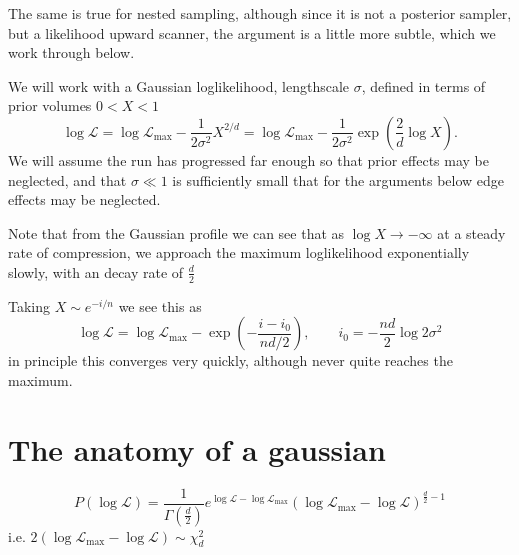\documentclass[usenatbib]{mnras}
\begin{document}
The same is true for nested sampling, although since it is not a posterior sampler, but a likelihood upward scanner, the argument is a little more subtle, which we work through below.



We will work with a Gaussian loglikelihood, lengthscale $\sigma$, defined in terms of prior volumes $0<X<1$
\begin{equation}
    \log\mathcal{L}
    =\log\mathcal{L}_\mathrm{max} - \frac{1}{2\sigma^2}X^{2/d}
    =\log\mathcal{L}_\mathrm{max} - \frac{1}{2\sigma^2}\exp\left(\frac{2}{d}\log X\right).
    \label{eq:LX}
\end{equation}
We will assume the run has progressed far enough so that prior effects may be neglected, and that $\sigma\ll 1$ is sufficiently small that for the arguments below edge effects may be neglected.

Note that from the Gaussian profile we can see that as $\log X\to-\infty$ at a steady rate of compression, we approach the maximum loglikelihood exponentially slowly, with an decay rate of $\frac{d}{2}$

Taking $X \sim e^{-i/n}$ we see this as
\begin{equation}
    \log\mathcal{L} = \log\mathcal{L}_\mathrm{max} - \exp\left(-\frac{i-i_0}{nd/2}\right), \qquad i_0 = -\frac{nd}{2}\log 2\sigma^2
\end{equation}
in principle this converges very quickly, although never quite reaches the maximum.

\section*{The anatomy of a gaussian}
\begin{equation}
    P(\log\mathcal{L}) = \frac{1}{\Gamma(\frac{d}{2})}e^{\log\mathcal{L}-\log\mathcal{L}_\mathrm{max}} (\log\mathcal{L}_\mathrm{max}-\log\mathcal{L})^{\frac{d}{2}-1}
\end{equation}
i.e. $2(\log\mathcal{L}_\mathrm{max}-\log\mathcal{L})\sim \chi^2_{d} $
\end{document}
